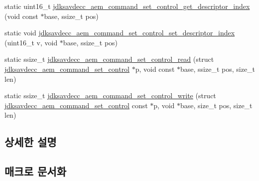 \begin{DoxyCompactItemize}
static uint16\+\_\+t \hyperlink{group__command__set__control_gafc0eea5691e5fc876385e663f57e2b40}{jdksavdecc\+\_\+aem\+\_\+command\+\_\+set\+\_\+control\+\_\+get\+\_\+descriptor\+\_\+index} (void const $\ast$base, ssize\+\_\+t pos)
\item 
static void \hyperlink{group__command__set__control_ga4ec3825da6eb948fa7369f822b4d317f}{jdksavdecc\+\_\+aem\+\_\+command\+\_\+set\+\_\+control\+\_\+set\+\_\+descriptor\+\_\+index} (uint16\+\_\+t v, void $\ast$base, ssize\+\_\+t pos)
\item 
static ssize\+\_\+t \hyperlink{group__command__set__control_ga3bffaa14c2bd112de565accfef21fedd}{jdksavdecc\+\_\+aem\+\_\+command\+\_\+set\+\_\+control\+\_\+read} (struct \hyperlink{structjdksavdecc__aem__command__set__control}{jdksavdecc\+\_\+aem\+\_\+command\+\_\+set\+\_\+control} $\ast$p, void const $\ast$base, ssize\+\_\+t pos, size\+\_\+t len)
\item 
static ssize\+\_\+t \hyperlink{group__command__set__control_ga0b8a1dcd8867aa3cf2d0f68f300a4f65}{jdksavdecc\+\_\+aem\+\_\+command\+\_\+set\+\_\+control\+\_\+write} (struct \hyperlink{structjdksavdecc__aem__command__set__control}{jdksavdecc\+\_\+aem\+\_\+command\+\_\+set\+\_\+control} const $\ast$p, void $\ast$base, size\+\_\+t pos, size\+\_\+t len)
\end{DoxyCompactItemize}


\subsection{상세한 설명}


\subsection{매크로 문서화}
